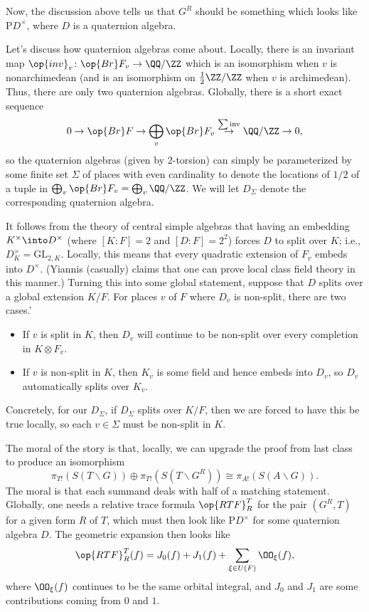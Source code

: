 \documentclass[../notes.tex]{subfiles}
\begin{document}
Now, the discussion above tells us that $G^R$ should be something which looks like $\mathrm PD^\times$, where $D$ is a quaternion algebra.
\begin{remark}
	Let's discuss how quaternion algebras come about. Locally, there is an invariant map $\op{inv}_v\colon\op{Br}F_v\to\QQ/\ZZ$ which is an isomorphism when $v$ is nonarchimedean (and is an isomorphism on $\frac12\ZZ/\ZZ$ when $v$ is archimedean). Thus, there are only two quaternion algebras. Globally, there is a short exact sequence
	\[0\to\op{Br}F\to\bigoplus_v\op{Br}F_v\stackrel{\sum\mathrm{inv}}\to\QQ/\ZZ\to0,\]
	so the quaternion algebras (given by $2$-torsion) can simply be parameterized by some finite set $\Sigma$ of places with even cardinality to denote the locations of $1/2$ of a tuple in $\bigoplus_v\op{Br}F_v=\bigoplus_v\QQ/\ZZ$. We will let $D_\Sigma$ denote the corresponding quaternion algebra.
\end{remark}
\begin{remark}
	It follows from the theory of central simple algebras that having an embedding $K^\times\into D^\times$ (where $[K:F]=2$ and $[D:F]=2^2$) forces $D$ to split over $K$; i.e., $D_K^\times=\mathrm{GL}_{2,K}$. Locally, this means that every quadratic extension of $F_v$ embeds into $D^\times$. (Yiannis (casually) claims that one can prove local class field theory in this manner.) Turning this into some global statement, suppose that $D$ splits over a global extension $K/F$. For places $v$ of $F$ where $D_v$ is non-split, there are two cases.'
	\begin{itemize}
		\item If $v$ is split in $K$, then $D_v$ will continue to be non-split over every completion in $K\otimes F_v$.
		\item If $v$ is non-split in $K$, then $K_v$ is some field and hence embeds into $D_v$, so $D_v$ automatically splits over $K_v$.
	\end{itemize}
	Concretely, for our $D_\Sigma$, if $D_\Sigma$ splits over $K/F$, then we are forced to have this be true locally, so each $v\in\Sigma$ must be non-split in $K$.
\end{remark}
The moral of the story is that, locally, we can upgrade the proof from last class to produce an isomorphism
\[\pi_{T!}(S(T\backslash G))\oplus\pi_{T!}\left(S(T\backslash G^R)\right)\cong\pi_{A!}(S(A\backslash G)).\]
The moral is that each summand deals with half of a matching statement. Globally, one needs a relative trace formula $\op{RTF}^T_R$ for the pair $\left(G^R,T\right)$ for a given form $R$ of $T$, which must then look like $\mathrm PD^\times$ for some quaternion algebra $D$. The geometric expansion then looks like
\[\op{RTF}^T_R(f)=J_0(f)+J_1(f)+\sum_{\xi\in U(F)}\OO_\xi(f),\]
where $\OO_\xi(f)$ continues to be the same orbital integral, and $J_0$ and $J_1$ are some contributions coming from $0$ and $1$.
\end{document}
